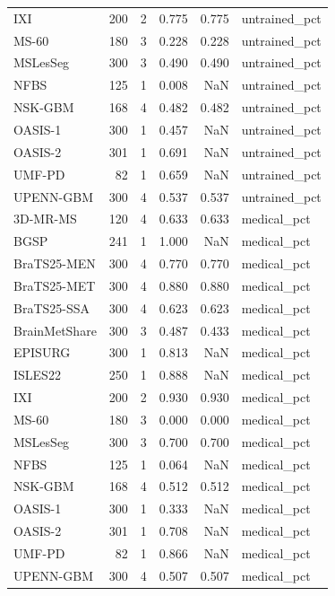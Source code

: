 \begin{tabular}{lrrrrl}
IXI & 200 & 2 & 0.775 & 0.775 & untrained\_pct \\
MS-60 & 180 & 3 & 0.228 & 0.228 & untrained\_pct \\
MSLesSeg & 300 & 3 & 0.490 & 0.490 & untrained\_pct \\
NFBS & 125 & 1 & 0.008 & NaN & untrained\_pct \\
NSK-GBM & 168 & 4 & 0.482 & 0.482 & untrained\_pct \\
OASIS-1 & 300 & 1 & 0.457 & NaN & untrained\_pct \\
OASIS-2 & 301 & 1 & 0.691 & NaN & untrained\_pct \\
UMF-PD & 82 & 1 & 0.659 & NaN & untrained\_pct \\
UPENN-GBM & 300 & 4 & 0.537 & 0.537 & untrained\_pct \\
3D-MR-MS & 120 & 4 & 0.633 & 0.633 & medical\_pct \\
BGSP & 241 & 1 & 1.000 & NaN & medical\_pct \\
BraTS25-MEN & 300 & 4 & 0.770 & 0.770 & medical\_pct \\
BraTS25-MET & 300 & 4 & 0.880 & 0.880 & medical\_pct \\
BraTS25-SSA & 300 & 4 & 0.623 & 0.623 & medical\_pct \\
BrainMetShare & 300 & 3 & 0.487 & 0.433 & medical\_pct \\
EPISURG & 300 & 1 & 0.813 & NaN & medical\_pct \\
ISLES22 & 250 & 1 & 0.888 & NaN & medical\_pct \\
IXI & 200 & 2 & 0.930 & 0.930 & medical\_pct \\
MS-60 & 180 & 3 & 0.000 & 0.000 & medical\_pct \\
MSLesSeg & 300 & 3 & 0.700 & 0.700 & medical\_pct \\
NFBS & 125 & 1 & 0.064 & NaN & medical\_pct \\
NSK-GBM & 168 & 4 & 0.512 & 0.512 & medical\_pct \\
OASIS-1 & 300 & 1 & 0.333 & NaN & medical\_pct \\
OASIS-2 & 301 & 1 & 0.708 & NaN & medical\_pct \\
UMF-PD & 82 & 1 & 0.866 & NaN & medical\_pct \\
UPENN-GBM & 300 & 4 & 0.507 & 0.507 & medical\_pct \\
\bottomrule
\end{tabular}
